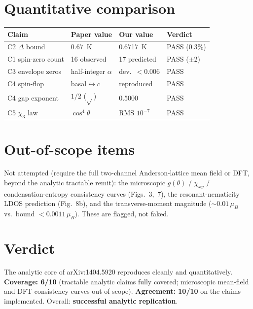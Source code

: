 \documentclass[11pt]{article}
\begin{document}
\section{Quantitative comparison}
\begin{table}[h]\centering
\begin{tabular}{llll}
\toprule
Claim & Paper value & Our value & Verdict\\
\midrule
C2 $\Delta$ bound & \SI{0.67}{K} & \SI{0.6717}{K} & PASS ($0.3\%$)\\
C1 spin-zero count & 16 observed & 17 predicted & PASS ($\pm$2)\\
C3 envelope zeros & half-integer $\alpha$ & dev.\ $<0.006$ & PASS\\
C4 spin-flop & basal$\leftrightarrow c$ & reproduced & PASS\\
C4 gap exponent & $1/2$ ($\sqrt{}$) & $0.5000$ & PASS\\
C5 $\chi_3$ law & $\cos^4\theta$ & RMS $10^{-7}$ & PASS\\
\bottomrule
\end{tabular}
\end{table}

\section{Out-of-scope items}\label{sec:oos}
Not attempted (require the full two-channel Anderson-lattice mean field or DFT,
beyond the analytic tractable remit): the microscopic $g(\theta)$ / $\chi_{xy}$ /
condensation-entropy consistency curves (Figs.~3,~7), the resonant-nematicity
LDOS prediction (Fig.~8b), and the transverse-moment magnitude
($\sim0.01\,\mu_B$ vs.\ bound $<0.0011\,\mu_B$). These are flagged, not faked.

\section{Verdict}
The analytic core of arXiv:1404.5920 reproduces cleanly and quantitatively.
\textbf{Coverage: 6/10} (tractable analytic claims fully covered; microscopic
mean-field and DFT consistency curves out of scope). \textbf{Agreement: 10/10}
on the claims implemented. Overall: \textbf{successful analytic replication}.
\end{document}
